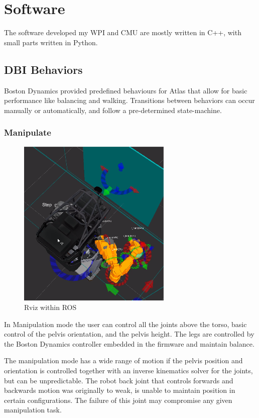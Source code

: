 \documentclass[12pt]{report}
\begin{document}
\section{Software}
The software developed my WPI and CMU are mostly written in C++, with small parts written in Python. 

\subsection{DBI Behaviors}
Boston Dynamics provided predefined behaviours for Atlas that allow for basic performance like balancing and walking. Transitions between behaviors can occur manually or automatically, and follow a pre-determined state-machine.

\subsubsection{Manipulate}
\begin{figure}
  \begin{center}
    \includegraphics[scale=0.5]{images/align_to_wall.png}
  \end{center}
  \caption{Rviz within ROS}
\end{figure}
In Manipulation mode the user can control all the joints above the torso, basic control of the pelvis orientation, and the pelvis height. The legs are controlled by the Boston Dynamics controller embedded in the firmware and maintain balance.

The manipulation mode has a wide range of motion if the pelvis position and orientation is controlled together with an inverse kinematics solver for the joints, but can be unpredictable. The robot back joint that controls forwards and backwards motion was originally to weak, is unable to maintain position in certain configurations. The failure of this joint may compromise any given manipulation task.
\end{document}
